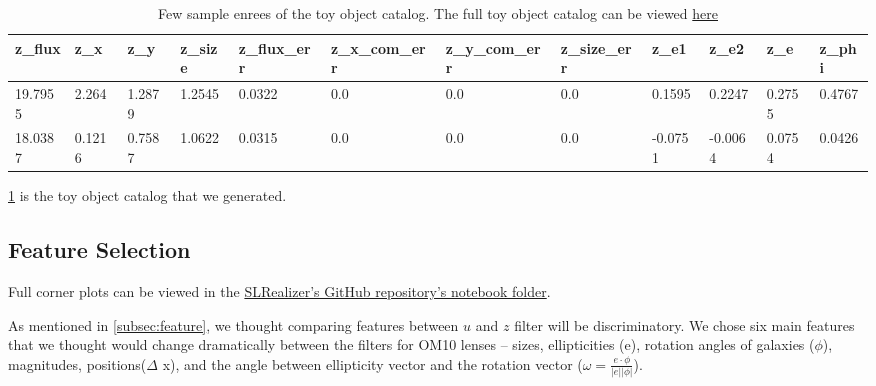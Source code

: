 \documentclass[\docopts]{\docclass}
\begin{document}
\begin{table}[!h]
\begin{tabular}{|l|l|l|l|l|l|l|l|l|l|l|l|}
\hline
z\_flux & z\_x   & z\_y   & z\_size & z\_flux\_err & z\_x\_com\_err & z\_y\_com\_err & z\_size\_err & z\_e1   & z\_e2   & z\_e   & z\_phi \\ \hline
19.7955 & 2.264  & 1.2879 & 1.2545  & 0.0322       & 0.0            & 0.0            & 0.0          & 0.1595  & 0.2247  & 0.2755 & 0.4767 \\
18.0387 & 0.1216 & 0.7587 & 1.0622  & 0.0315       & 0.0            & 0.0            & 0.0          & -0.0751 & -0.0064 & 0.0754 & 0.0426 \\ \hline
\end{tabular}

\caption{Few sample enrees of the toy object catalog. The full toy object catalog can be viewed \href{https://www.dropbox.com/s/ob51rxjexzuervl/toy_object_catalog.csv?dl=0}{here}}
\label{table:object_table}
\end{table}

\ref{table:object_table} is the toy object catalog that we generated.

\subsection{Feature Selection}
\label{subsec:feature_data}

Full corner plots can be viewed in the \href{https://github.com/jennykim1016/SLRealizer/blob/master/notebooks/SDSSvsOM10.ipynb}{SLRealizer's GitHub repository's notebook folder}.

As mentioned in \ref{subsec:feature}, we thought comparing features between $u$ and $z$ filter will be discriminatory. We chose six main features that we thought would change dramatically between the filters for OM10 lenses -- sizes, ellipticities (e), rotation angles of galaxies ($\phi$), magnitudes, positions($\Delta$ x), and the angle between ellipticity vector and the rotation vector ($\omega = \frac{e \cdot \phi}{ \left | e \right | \left | \phi \right |}$).
\end{document}
